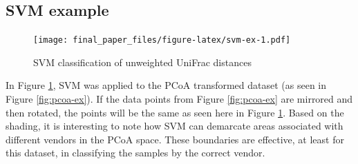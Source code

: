 \documentclass[12pt,openany]{book}
\newenvironment{Shaded}{\begin{snugshade}}{\end{snugshade}}
\newcommand{\KeywordTok}[1]{\textcolor[rgb]{0.13,0.29,0.53}{\textbf{#1}}}
\newcommand{\DataTypeTok}[1]{\textcolor[rgb]{0.13,0.29,0.53}{#1}}
\newcommand{\DecValTok}[1]{\textcolor[rgb]{0.00,0.00,0.81}{#1}}
\newcommand{\FloatTok}[1]{\textcolor[rgb]{0.00,0.00,0.81}{#1}}
\newcommand{\StringTok}[1]{\textcolor[rgb]{0.31,0.60,0.02}{#1}}
\newcommand{\CommentTok}[1]{\textcolor[rgb]{0.56,0.35,0.01}{\textit{#1}}}
\newcommand{\OtherTok}[1]{\textcolor[rgb]{0.56,0.35,0.01}{#1}}
\newcommand{\OperatorTok}[1]{\textcolor[rgb]{0.81,0.36,0.00}{\textbf{#1}}}
\newcommand{\NormalTok}[1]{#1}
\begin{document}
\subsection{SVM example}\label{svm-example}

\begin{Shaded}
\end{Shaded}

\begin{figure}
\centering
\texttt{[image: final\_paper\_files/figure-latex/svm-ex-1.pdf]}
\caption{\label{fig:svm-ex}SVM classification of unweighted UniFrac
distances}
\end{figure}

In Figure \ref{fig:svm-ex}, SVM was applied to the PCoA transformed
dataset (as seen in Figure \ref{fig:pcoa-ex}). If the data points from
Figure \ref{fig:pcoa-ex} are mirrored and then rotated, the points will
be the same as seen here in Figure \ref{fig:svm-ex}. Based on the
shading, it is interesting to note how SVM can demarcate areas
associated with different vendors in the PCoA space. These boundaries
are effective, at least for this dataset, in classifying the samples by
the correct vendor.
\end{document}
